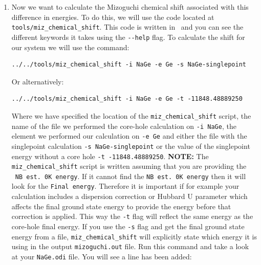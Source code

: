 \documentclass[a4paper,11pt,twoside]{book}
\begin{document}
{\begin{enumerate}
\begin{verbatim}
%BLOCK species_pot
Ge 3|1.5|13|15|17|30U:31U:32:40:41(qc=6)
Na 2|1.3|14|16|18|20U:30:21(qc=7)
%ENDBLOCK species_pot
\end{verbatim}
To run a singlepoint calculation, we want to remove the \verb#CHARGE : +1# that we added in the \verb#.param# file and change the task to \verb#task : singlepoint# so your \verb#NaGe-singlepoint.param# file should look like:
\begin{verbatim}
task : singlepoint 
cut_off_energy : 250 eV
xc_functional : PBE
! charge : +1
write_checkpoint : None
\end{verbatim}
Here we have commented out the line for charge inclusion, and changed the task keyword. Run the \castep\ calculation and compare the ground state total energies of your two different files. You should see that the groundstate energy of -11848.48889250 eV is less than the core hole groundstate energy. 
\item Now we want to calculate the Mizoguchi chemical shift associated with this difference in energies. To do this, we will use the code located at \verb#tools/miz_chemical_shift#. This code is written in \python\ and you can see the different keywords it takes using the \verb#--help# flag. To calculate the shift for our system we will use the command:
\begin{verbatim}
../../tools/miz_chemical_shift -i NaGe -e Ge -s NaGe-singlepoint
\end{verbatim}
Or alternatively:
\begin{verbatim}
../../tools/miz_chemical_shift -i NaGe -e Ge -t -11848.48889250
\end{verbatim}
Where we have specified the location of the \verb#miz_chemical_shift# script, the name of the file we performed the core-hole calculation on \verb#-i NaGe#, the element we performed our calculation on \verb#-e Ge# and either the file with the singlepoint calculation \verb#-s NaGe-singlepoint# or the value of the singlepoint energy without a core hole \verb#-t -11848.48889250#. \textbf{NOTE:} The \verb#miz_chemical_shift# script is written assuming that you are providing the \castep\ \verb#NB est. 0K energy#. If it cannot find the \verb#NB est. 0K energy# then it will look for the \verb#Final energy#. Therefore it is important if for example your calculation includes a dispersion correction or Hubbard U parameter which affects the final ground state energy to provide the energy before that correction is applied. This way the \verb#-t# flag will reflect the same energy as the core-hole final energy. If you use the \verb#-s# flag and get the final ground state energy from a file, \verb#miz_chemical_shift# will explicitly state which energy it is using in the output \verb#mizoguchi.out# file. Run this command and take a look at your \verb#NaGe.odi# file. You will see a line has been added:

\end{enumerate}}
\end{document}

